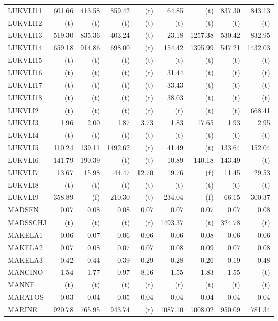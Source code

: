 \documentclass[11pt,twoside]{article}
\begin{document}
{\begin{longtable}[c]{|l|r|r|r|r|r|r|r|r|}
LUKVLI11 & 601.66 & 413.58 & 859.42 & (t) & 64.85 & (t) & 837.30 & 843.13 \\
LUKVLI12 & (t) & (t) & (t) & (t) & (t) & (t) & (t) & (t) \\
LUKVLI13 & 519.30 & 835.36 & 403.24 & (t) & 23.18 & 1257.38 & 530.42 & 832.95 \\
LUKVLI14 & 659.18 & 914.86 & 698.00 & (t) & 154.42 & 1395.99 & 547.21 & 1432.03 \\
LUKVLI15 & (t) & (t) & (t) & (t) & (t) & (t) & (t) & (t) \\
LUKVLI16 & (t) & (t) & (t) & (t) & 31.44 & (t) & (t) & (t) \\
LUKVLI17 & (t) & (t) & (t) & (t) & 33.43 & (t) & (t) & (t) \\
LUKVLI18 & (t) & (t) & (t) & (t) & 38.03 & (t) & (t) & (t) \\
LUKVLI2 & (t) & (t) & (t) & (t) & (t) & (t) & (t) & 668.41 \\
LUKVLI3 & 1.96 & 2.00 & 1.87 & 3.73 & 1.83 & 17.65 & 1.93 & 2.95 \\
LUKVLI4 & (t) & (t) & (t) & (t) & (t) & (t) & (t) & (t) \\
LUKVLI5 & 110.24 & 139.11 & 1492.62 & (t) & 41.49 & (t) & 133.64 & 152.04 \\
LUKVLI6 & 141.79 & 190.39 & (t) & (t) & 10.89 & 140.18 & 143.49 & (t) \\
LUKVLI7 & 13.67 & 15.98 & 44.47 & 12.70 & 19.76 & (f) & 11.45 & 29.53 \\
LUKVLI8 & (t) & (t) & (t) & (t) & (t) & (t) & (t) & (t) \\
LUKVLI9 & 358.89 & (f) & 210.30 & (t) & 234.04 & (f) & 66.15 & 300.37 \\
MADSEN & 0.07 & 0.08 & 0.08 & 0.07 & 0.07 & 0.07 & 0.07 & 0.08 \\
MADSSCHJ & (t) & (t) & (t) & (t) & 1493.37 & (t) & 324.78 & (t) \\
MAKELA1 & 0.06 & 0.07 & 0.06 & 0.06 & 0.06 & 0.08 & 0.06 & 0.06 \\
MAKELA2 & 0.07 & 0.08 & 0.07 & 0.07 & 0.08 & 0.09 & 0.07 & 0.08 \\
MAKELA3 & 0.42 & 0.44 & 0.39 & 0.29 & 0.28 & 0.26 & 0.19 & 0.48 \\
MANCINO & 1.54 & 1.77 & 0.97 & 8.16 & 1.55 & 1.83 & 1.55 & (t) \\
MANNE & (t) & (t) & (t) & (t) & (t) & (t) & (t) & (t) \\
MARATOS & 0.03 & 0.04 & 0.05 & 0.04 & 0.04 & 0.04 & 0.04 & 0.04 \\
MARINE & 920.78 & 765.95 & 943.74 & (t) & 1087.10 & 1008.02 & 950.09 & 781.34 \\

\end{longtable}}
\end{document}
